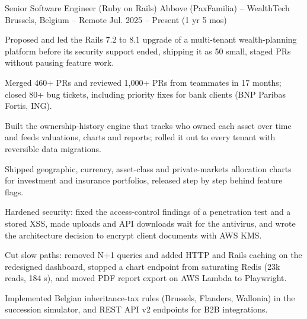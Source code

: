 
\begin{cventries}

\cventry
  {Senior Software Engineer (Ruby on Rails)}
  {Abbove (PaxFamilia) – WealthTech}
  {Brussels, Belgium – Remote}
  {Jul. 2025 – Present (1 yr 5 mos)}
  {
    \begin{cvitems}
      \item {Proposed and led the Rails 7.2 to 8.1 upgrade of a multi-tenant wealth-planning platform before its security support ended, shipping it as 50 small, staged PRs without pausing feature work.}
      \item {Merged 460+ PRs and reviewed 1,000+ PRs from teammates in 17 months; closed 80+ bug tickets, including priority fixes for bank clients (BNP Paribas Fortis, ING).}
      \item {Built the ownership-history engine that tracks who owned each asset over time and feeds valuations, charts and reports; rolled it out to every tenant with reversible data migrations.}
      \item {Shipped geographic, currency, asset-class and private-markets allocation charts for investment and insurance portfolios, released step by step behind feature flags.}
      \item {Hardened security: fixed the access-control findings of a penetration test and a stored XSS, made uploads and API downloads wait for the antivirus, and wrote the architecture decision to encrypt client documents with AWS KMS.}
      \item {Cut slow paths: removed N+1 queries and added HTTP and Rails caching on the redesigned dashboard, stopped a chart endpoint from saturating Redis (23k reads, 184 s), and moved PDF report export on AWS Lambda to Playwright.}
      \item {Implemented Belgian inheritance-tax rules (Brussels, Flanders, Wallonia) in the succession simulator, and REST API v2 endpoints for B2B integrations.}
    \end{cvitems}
  }


\end{cventries}
